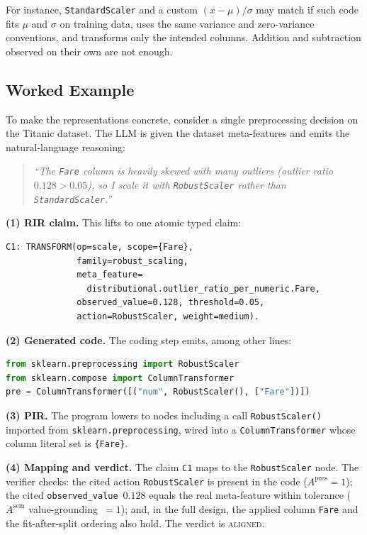 For instance, \texttt{StandardScaler} and a custom $(x - \mu)/\sigma$
may match if such code fits $\mu$ and $\sigma$ on training data,
uses the same variance and zero-variance conventions, and transforms
only the intended columns. Addition and subtraction observed on their
own are not enough.

\subsection{Worked Example}
\label{sec:worked-example}

To make the representations concrete, consider a single
preprocessing decision on the Titanic dataset. The LLM is given the
dataset meta-features and emits the natural-language reasoning:

\begin{quote}\itshape
``The \texttt{Fare} column is heavily skewed with many outliers
(outlier ratio $0.128 > 0.05$), so I scale it with
\texttt{RobustScaler} rather than \texttt{StandardScaler}.''
\end{quote}

\noindent\textbf{(1) RIR claim.} This lifts to one atomic typed
claim:
\begin{verbatim}
C1: TRANSFORM(op=scale, scope={Fare},
              family=robust_scaling,
              meta_feature=
                distributional.outlier_ratio_per_numeric.Fare,
              observed_value=0.128, threshold=0.05,
              action=RobustScaler, weight=medium).
\end{verbatim}

\noindent\textbf{(2) Generated code.} The coding step emits, among
other lines:
\begin{lstlisting}[language=Python]
from sklearn.preprocessing import RobustScaler
from sklearn.compose import ColumnTransformer
pre = ColumnTransformer([("num", RobustScaler(), ["Fare"])])
\end{lstlisting}

\noindent\textbf{(3) PIR.} The program lowers to nodes including a
call \texttt{RobustScaler()} imported from
\texttt{sklearn.preprocessing}, wired into a
\texttt{ColumnTransformer} whose column literal set is
\texttt{\{Fare\}}.

\noindent\textbf{(4) Mapping and verdict.} The claim \texttt{C1} maps
to the \texttt{RobustScaler} node. The verifier checks: the cited
action \texttt{RobustScaler} is present in the code
($A^{\mathrm{pres}}=1$); the cited
\texttt{observed\_value}~$0.128$ equals the real meta-feature within
tolerance ($A^{\mathrm{sem}}$ value-grounding~$=1$); and, in the
full design, the applied column \texttt{Fare} and the fit-after-split
ordering also hold. The verdict is \textsc{aligned}.

